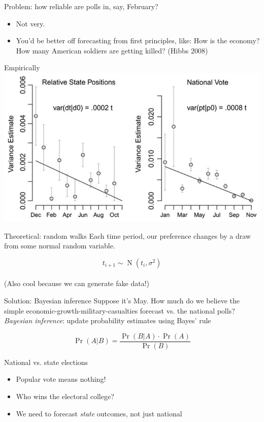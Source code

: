 \documentclass[14pt]{beamer}
\DeclareMathOperator{\N}{N}
\newcommand{\bi}{\begin{itemize}}
\newcommand{\ei}{\end{itemize}}
\begin{document}
\begin{frame}[t]{Problem: how reliable are polls in, say, February?}
\begin{itemize}
\item Not very.
\item You'd be better off forecasting from first principles, like: How is the economy? How many American soldiers are getting killed? (Hibbs 2008)
\end{itemize}
\end{frame}

\begin{frame}{Empirically}
\includegraphics[width=\textwidth]{bayescombo_timevariance.png}
\end{frame}

\begin{frame}[t]{Theoretical: random walks}
Each time period, our preference changes by a draw from some normal random variable.

\[t_{i+1} \sim \N(t_i, \sigma^2)\]
\\[1em]
(Also cool because we can generate fake data!)
\end{frame}

\begin{frame}[t]{Solution: Bayesian inference}
Suppose it's May. How much do we believe the simple economic-growth-military-casualties forecast vs. the national polls?
\\[1em]
\emph{Bayesian inference}: update probability estimates using Bayes' rule

\[\Pr(A|B) = \frac{\Pr(B|A) \cdot \Pr(A)}{\Pr(B)}\]
\end{frame}

\begin{frame}[t]{National vs. state elections}
\bi
\item Popular vote means nothing!
\item Who wins the electoral college?
\item We need to forecast \emph{state} outcomes, not just national
\ei
\end{frame}
\end{document}
